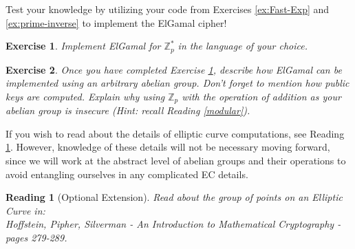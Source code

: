 \documentclass[12pt]{article}
\newcommand{\Z}[0]{\mathbb{Z}}
\newtheorem{exercise}{Exercise}
\newtheorem{reading}{Reading}
\theoremstyle{definition}
\theoremstyle{remark}
\theoremstyle{definition}
\begin{document}
Test your knowledge by utilizing your code from Exercises \ref{ex:Fast-Exp} and \ref{ex:prime-inverse} to implement the ElGamal cipher!

\begin{exercise}\label{ex:ElGamal}
Implement ElGamal for $\Z_p^*$ in the language of your choice.
\end{exercise}

\begin{exercise}\label{ex:general-ElGamal}
Once you have completed Exercise \ref{ex:ElGamal}, describe how ElGamal can be implemented using an arbitrary abelian group. Don't forget to mention how public keys are computed. Explain why using $\Z_p$ with the operation of addition as your abelian group is insecure (Hint: recall Reading \ref{modular}).
\end{exercise}

If you wish to read about the details of elliptic curve computations, see Reading \ref{ec}. However, knowledge of these details will not be necessary moving forward, since we will work at the abstract level of abelian groups and their operations to avoid entangling ourselves in any complicated EC details.

\begin{reading}[Optional Extension]\label{ec}
Read about the group of points on an Elliptic Curve in:\\
Hoffstein, Pipher, Silverman - An Introduction to Mathematical Cryptography - pages 279-289.
\end{reading}
\end{document}
